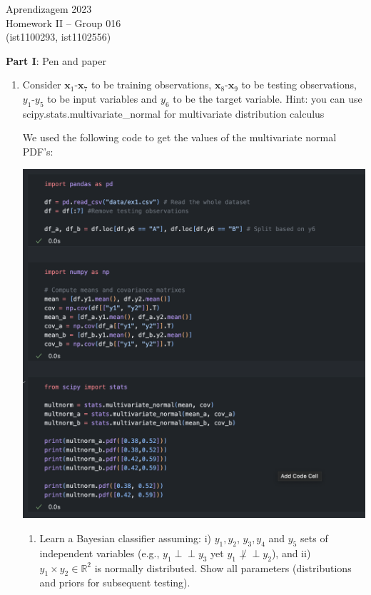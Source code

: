 \documentclass[12pt]{article}
\begin{document}
\newcommand{\prob}{\textrm{P}}
\newcommand{\ind}{\perp\!\!\!\!\!\perp} 
\newcommand{\notind}{\not\perp\!\!\!\!\!\perp}
\newcommand{\defeq}{\vcentcolon=}

\center
Aprendizagem 2023\\
Homework II -- Group 016\\
(ist1100293, ist1102556)\vskip 1cm

\large{\textbf{Part I}: Pen and paper}\normalsize

\begin{enumerate}[leftmargin=\labelsep]

\item Consider $\mathbf{x}_1$-$\mathbf{x}_7$ to be training observations, $\mathbf{x}_8$-$\mathbf{x}_9$ to be testing observations, $y_1$-$y_5$ to be input
variables and $y_6$ to be the target variable.
Hint: you can use scipy.stats.multivariate\_normal for multivariate distribution calculus

    We used the following code to get the values of the multivariate normal PDF's:

    \begin{center}
        \includegraphics[scale=0.5]{images/code1.png}
    \end{center}

    \begin{enumerate}
        \item Learn a Bayesian classifier assuming: i) ${y_1, y_2}$, ${y_3, y_4}$ and ${y_5}$ sets of independent
        variables (e.g., $y_1 \ind y_3$ yet $y_1 \notind y_2$), and ii) $y_1 \times y_2 \in \mathbb{R}^2$
        is normally distributed. Show all
        parameters (distributions and priors for subsequent testing).


\end{enumerate}
\end{enumerate}
\end{document}
